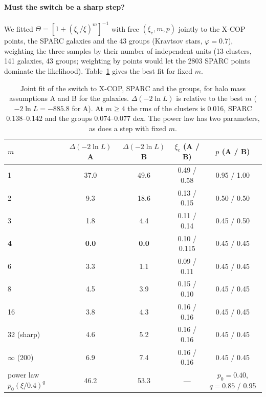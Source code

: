 \documentclass[11pt,a4paper]{article}
\begin{document}
\paragraph{Must the switch be a sharp step?} We fitted $\Theta=[1+(\xi_c/\xi)^m]^{-1}$ with free $(\xi_c,m,p)$ jointly to the X-COP points, the SPARC galaxies and the 43 groups (Kravtsov stars, $\varphi=0.7$), weighting the three samples by their number of independent units (13 clusters, 141 galaxies, 43 groups; weighting by points would let the 2803 SPARC points dominate the likelihood). Table~\ref{tab:switch} gives the best fit for fixed $m$.

\begin{table}[h]
\centering\small
\begin{tabular}{lcccc}
\toprule
$m$ & $\Delta(-2\ln L)$ A & $\Delta(-2\ln L)$ B & $\xi_c$ (A / B) & $p$ (A / B) \\
\midrule
1 & 37.0 & 49.6 & 0.49 / 0.58 & 0.95 / 1.00 \\
2 & 9.3 & 18.6 & 0.13 / 0.15 & 0.50 / 0.50 \\
3 & 1.8 & 4.4 & 0.11 / 0.14 & 0.45 / 0.50 \\
\textbf{4} & \textbf{0.0} & \textbf{0.0} & 0.10 / 0.115 & 0.45 / 0.45 \\
6 & 3.3 & 1.1 & 0.09 / 0.11 & 0.45 / 0.45 \\
8 & 4.5 & 3.9 & 0.15 / 0.10 & 0.45 / 0.45 \\
16 & 3.8 & 4.3 & 0.16 / 0.16 & 0.45 / 0.45 \\
32 (sharp) & 4.6 & 5.2 & 0.16 / 0.16 & 0.45 / 0.45 \\
$\infty$ (200) & 6.9 & 7.4 & 0.16 / 0.16 & 0.45 / 0.45 \\
\midrule
power law $p_0(\xi/0.4)^q$ & 46.2 & 53.3 & --- & $p_0=0.40$, $q=0.85$ / 0.95 \\
\bottomrule
\end{tabular}
\caption{Joint fit of the switch to X-COP, SPARC and the groups, for halo mass assumptions A and B for the galaxies. $\Delta(-2\ln L)$ is relative to the best $m$ ($-2\ln L=-885.8$ for A). At $m\ge4$ the rms of the clusters is 0.016, SPARC 0.138--0.142 and the groups 0.074--0.077 dex. The power law has two parameters, as does a step with fixed $m$.}
\label{tab:switch}
\end{table}
\end{document}
